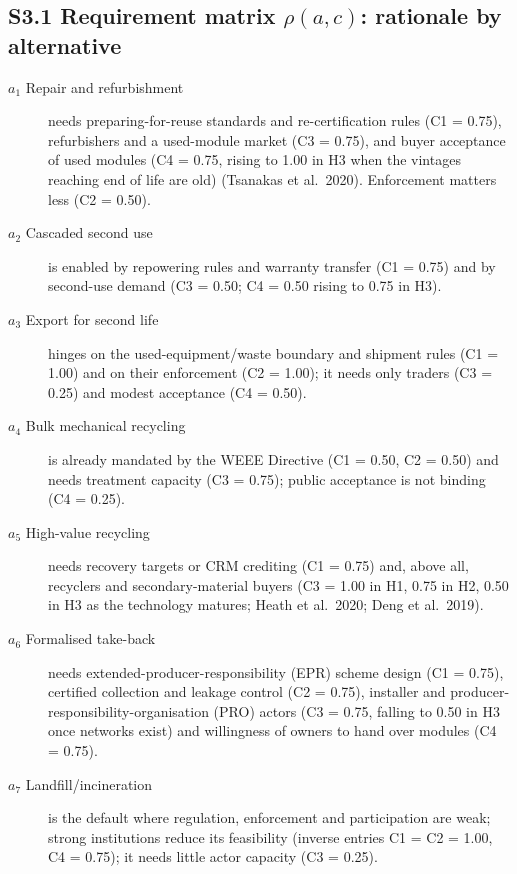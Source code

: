 \documentclass[11pt]{article}
\begin{document}
\subsection*{S3.1 Requirement matrix $\rho(a,c)$: rationale by alternative}
\begin{description}
\item[$a_1$ Repair and refurbishment] needs preparing-for-reuse standards and re-certification rules (C1 = 0.75), refurbishers and a used-module market (C3 = 0.75), and buyer acceptance of used modules (C4 = 0.75, rising to 1.00 in H3 when the vintages reaching end of life are old) (Tsanakas et al.\ 2020). Enforcement matters less (C2 = 0.50).
\item[$a_2$ Cascaded second use] is enabled by repowering rules and warranty transfer (C1 = 0.75) and by second-use demand (C3 = 0.50; C4 = 0.50 rising to 0.75 in H3).
\item[$a_3$ Export for second life] hinges on the used-equipment/waste boundary and shipment rules (C1 = 1.00) and on their enforcement (C2 = 1.00); it needs only traders (C3 = 0.25) and modest acceptance (C4 = 0.50).
\item[$a_4$ Bulk mechanical recycling] is already mandated by the WEEE Directive (C1 = 0.50, C2 = 0.50) and needs treatment capacity (C3 = 0.75); public acceptance is not binding (C4 = 0.25).
\item[$a_5$ High-value recycling] needs recovery targets or CRM crediting (C1 = 0.75) and, above all, recyclers and secondary-material buyers (C3 = 1.00 in H1, 0.75 in H2, 0.50 in H3 as the technology matures; Heath et al.\ 2020; Deng et al.\ 2019).
\item[$a_6$ Formalised take-back] needs extended-producer-responsibility (EPR) scheme design (C1 = 0.75), certified collection and leakage control (C2 = 0.75), installer and producer-responsibility-organisation (PRO) actors (C3 = 0.75, falling to 0.50 in H3 once networks exist) and willingness of owners to hand over modules (C4 = 0.75).
\item[$a_7$ Landfill/incineration] is the default where regulation, enforcement and participation are weak; strong institutions reduce its feasibility (inverse entries C1 = C2 = 1.00, C4 = 0.75); it needs little actor capacity (C3 = 0.25).
\end{description}
\end{document}
